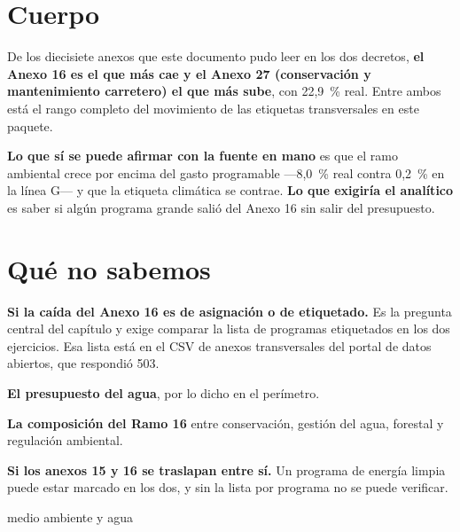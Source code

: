 \section{Cuerpo}

De los diecisiete anexos que este documento pudo leer en los dos decretos, \textbf{el Anexo
16 es el que más cae y el Anexo 27 (conservación y mantenimiento carretero) el que más sube},
con 22,9~\% real. Entre ambos está el rango completo del movimiento de las etiquetas
transversales en este paquete.

\textbf{Lo que sí se puede afirmar con la fuente en mano} es que el ramo ambiental crece por
encima del gasto programable ---8,0~\% real contra 0,2~\% en la línea G--- y que la etiqueta
climática se contrae. \textbf{Lo que exigiría el analítico} es saber si algún programa grande
salió del Anexo 16 sin salir del presupuesto.

\section{Qué no sabemos}

\begin{list}{}{\setlength{\leftmargin}{1.4em}\setlength{\itemsep}{2pt}}
\item[$\bullet$] \textbf{Si la caída del Anexo 16 es de asignación o de etiquetado.} Es la
pregunta central del capítulo y exige comparar la lista de programas etiquetados en los dos
ejercicios. Esa lista está en el CSV de anexos transversales del portal de datos abiertos,
que respondió 503.
\item[$\bullet$] \textbf{El presupuesto del agua}, por lo dicho en el perímetro.
\item[$\bullet$] \textbf{La composición del Ramo 16} entre conservación, gestión del agua,
forestal y regulación ambiental.
\item[$\bullet$] \textbf{Si los anexos 15 y 16 se traslapan entre sí.} Un programa de energía
limpia puede estar marcado en los dos, y sin la lista por programa no se puede verificar.
\end{list}

\begin{ficha}{medio ambiente y agua}
\end{ficha}
